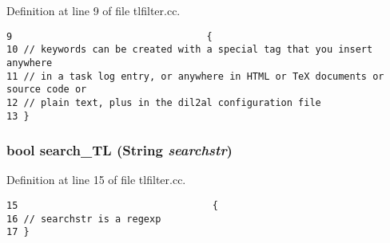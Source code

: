Definition at line 9 of file tlfilter.cc.



\footnotesize\begin{verbatim}9                                  {
10 // keywords can be created with a special tag that you insert anywhere
11 // in a task log entry, or anywhere in HTML or TeX documents or source code or
12 // plain text, plus in the dil2al configuration file
13 }
\end{verbatim}\normalsize 
{}
\subsubsection{\setlength{\rightskip}{0pt plus 5cm}bool search\_\-TL ({\bf String} {\em searchstr})}\label{tlfilter_8cc_a2}




Definition at line 15 of file tlfilter.cc.



\footnotesize\begin{verbatim}15                                  {
16 // searchstr is a regexp
17 }
\end{verbatim}\normalsize 

